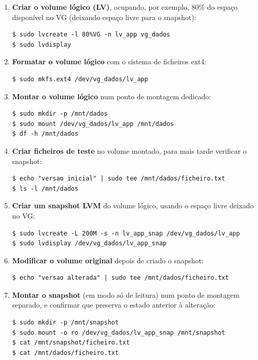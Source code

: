 \documentclass[11pt,a4paper]{article}
\begin{document}
\begin{enumerate}[label=\arabic*.,resume]
    \item \textbf{Criar o volume lógico (LV)}, ocupando, por exemplo, 80\% do espaço disponível no VG (deixando espaço livre para o snapshot):
\begin{lstlisting}
$ sudo lvcreate -l 80%VG -n lv_app vg_dados
$ sudo lvdisplay
\end{lstlisting}

    \item \textbf{Formatar o volume lógico} com o sistema de ficheiros ext4:
\begin{lstlisting}
$ sudo mkfs.ext4 /dev/vg_dados/lv_app
\end{lstlisting}

    \item \textbf{Montar o volume lógico} num ponto de montagem dedicado:
\begin{lstlisting}
$ sudo mkdir -p /mnt/dados
$ sudo mount /dev/vg_dados/lv_app /mnt/dados
$ df -h /mnt/dados
\end{lstlisting}

    \item \textbf{Criar ficheiros de teste} no volume montado, para mais tarde verificar o snapshot:
\begin{lstlisting}
$ echo "versao inicial" | sudo tee /mnt/dados/ficheiro.txt
$ ls -l /mnt/dados
\end{lstlisting}

    \item \textbf{Criar um snapshot LVM} do volume lógico, usando o espaço livre deixado no VG:
\begin{lstlisting}
$ sudo lvcreate -L 200M -s -n lv_app_snap /dev/vg_dados/lv_app
$ sudo lvdisplay /dev/vg_dados/lv_app_snap
\end{lstlisting}

    \item \textbf{Modificar o volume original} depois de criado o snapshot:
\begin{lstlisting}
$ echo "versao alterada" | sudo tee /mnt/dados/ficheiro.txt
\end{lstlisting}

    \item \textbf{Montar o snapshot} (em modo só de leitura) num ponto de montagem separado, e confirmar que preserva o estado anterior à alteração:
\begin{lstlisting}
$ sudo mkdir -p /mnt/snapshot
$ sudo mount -o ro /dev/vg_dados/lv_app_snap /mnt/snapshot
$ cat /mnt/snapshot/ficheiro.txt
$ cat /mnt/dados/ficheiro.txt
\end{lstlisting}

\end{enumerate}
\end{document}

